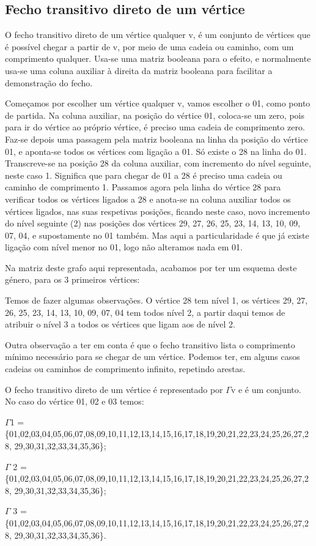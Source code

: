 \subsection{  Fecho transitivo direto de um vértice }
O fecho transitivo direto de um vértice qualquer v, é um conjunto de vértices que é possível chegar a
partir de v, por meio de uma cadeia ou caminho, com um comprimento qualquer. Usa-se uma matriz booleana 
para o efeito, e normalmente usa-se uma coluna auxiliar à direita da matriz booleana para facilitar a 
demonstração do fecho.\par
Começamos por escolher um vértice qualquer v, vamos escolher o 01, como ponto de partida. Na coluna
auxiliar, na posição do vértice 01, coloca-se um zero, pois para ir do vértice ao próprio vértice, é preciso uma 
cadeia de comprimento zero. Faz-se depois uma passagem pela matriz booleana na linha da posição do vértice
01, e aponta-se todos os vértices com ligação a 01. Só existe o 28 na linha do 01. Transcreve-se na posição 28
da coluna auxiliar, com incremento do nível seguinte, neste caso 1. Significa que para chegar de 01 a 28 é 
preciso uma cadeia ou caminho de comprimento 1. Passamos agora pela linha do vértice 28 para verificar
todos os vértices ligados a 28 e anota-se na coluna auxiliar todos os vértices ligados, nas suas respetivas 
posições, ficando neste caso, novo incremento do nível seguinte (2) nas posições dos vértices 29, 27, 26, 25, 
23, 14, 13, 10, 09, 07, 04, e supostamente no 01 também. Mas aqui a particularidade é que já existe ligação 
com nível menor no 01, logo não alteramos nada em 01.\par
Na matriz deste grafo aqui representada, acabamos por ter um esquema deste género, para os 3 
primeiros vértices:\par
Temos de fazer algumas observações. O vértice 28 tem nível 1, os vértices 29, 27, 26, 25, 23, 14, 13, 10, 
09, 07, 04 tem todos nível 2, a partir daqui temos de atribuir o nível 3 a todos os vértices que ligam aos de 
nível 2.\par
Outra observação a ter em conta é que o fecho transitivo lista o comprimento mínimo necessário para se 
chegar de um vértice. Podemos ter, em alguns casos cadeias ou caminhos de comprimento infinito, repetindo 
arestas.\par
O fecho transitivo direto de um vértice é representado por $\Gamma$v e é um conjunto. No caso do vértice 01, 02 e 
03 temos:\par
$\Gamma$1 =\\
\{01,02,03,04,05,06,07,08,09,10,11,12,13,14,15,16,17,18,19,20,21,22,23,24,25,26,27,28,
29,30,31,32,33,34,35,36\};\par
$\Gamma$ 2 =\\
\{01,02,03,04,05,06,07,08,09,10,11,12,13,14,15,16,17,18,19,20,21,22,23,24,25,26,27,28,
29,30,31,32,33,34,35,36\};\par
$\Gamma$ 3 =\\
\{01,02,03,04,05,06,07,08,09,10,11,12,13,14,15,16,17,18,19,20,21,22,23,24,25,26,27,28,
29,30,31,32,33,34,35,36\}.\par
